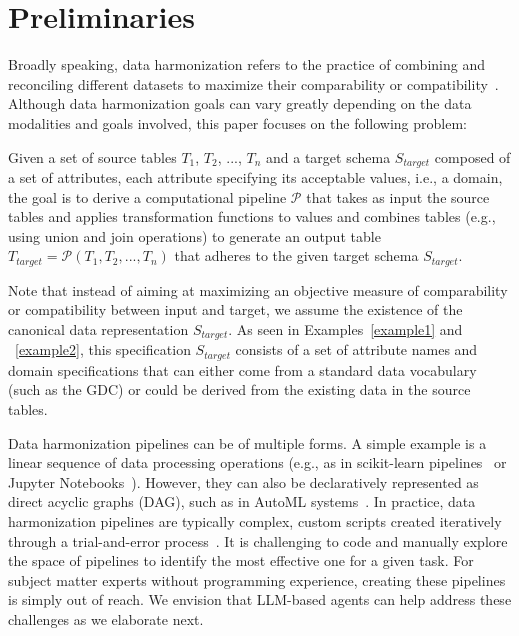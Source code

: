 \vspace{1em}
\section{Preliminaries}
\label{sec:preliminaries}

Broadly speaking, data harmonization refers to the practice of combining and reconciling different datasets to maximize their comparability or compatibility~\cite{cheng2024general}.
Although data harmonization goals can vary greatly depending on the data modalities and goals involved, this paper focuses on the following problem:

\begin{definition}
Given a set of source tables $T_{1}$, $T_{2}$, ..., $T_{n}$ and a target schema $S_{target}$ composed of a set of attributes, each attribute specifying its acceptable values, i.e., a domain, the goal is to derive a computational pipeline $\mathcal{P}$ that takes as input the source tables and applies transformation functions to values and combines tables (e.g., using union and join operations) to generate an output table $T_{target} = \mathcal{P}(T_1, T_2, ..., T_n)$ that adheres to the given target schema $S_{target}$.
\end{definition}

Note that instead of aiming at maximizing an objective measure of comparability or compatibility between input and target, we assume the existence of the canonical data representation $S_{target}$. 
As seen in Examples~\ref{example1} and ~\ref{example2}, this specification $S_{target}$ consists of a set of attribute names and domain specifications that can either come from a standard data vocabulary (such as the GDC) or could be derived from the existing data in the source tables.

Data harmonization pipelines can be of multiple forms. A simple example is a linear sequence of data processing operations (e.g., as in scikit-learn pipelines~\cite{sklearn-pipelines} or Jupyter Notebooks~\cite{jupyter}). However, they can also be declaratively represented as direct acyclic graphs (DAG), such as in AutoML systems~\cite{lopez2023alphad3m, shang2019democratizing}.
In practice, data harmonization pipelines are typically complex, custom scripts created iteratively through a trial-and-error process~\cite{cheng2024general}.
It is challenging to code and manually explore the space of pipelines to identify the most effective one for a given task. For subject matter experts without programming experience, creating these pipelines is simply out of reach. We envision that LLM-based agents can help address these challenges as we elaborate next.